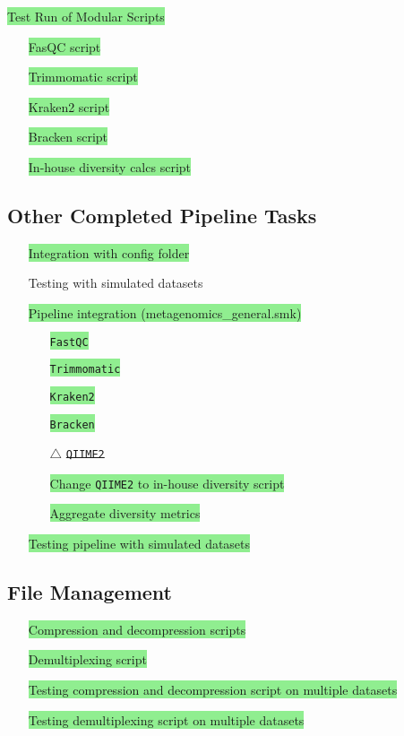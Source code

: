\documentclass[11pt]{report}
\newcommand{\done}{\checkmark}
\newcommand{\issue}{$\triangle$}
\newcommand{\highlightessential}[1]{\colorbox{lightgreen}{#1}}
\newcommand{\highlightoptional}[1]{\colorbox{lightorange}{#1}}
\newcommand{\deprecated}[1]{\sout{#1}}
\begin{document}
\begin{multicols}{2}
\highlightessential{Test Run of Modular Scripts}
\begin{itemize}
	\item [\done] \highlightessential{FasQC script}
	\item [\done] \highlightessential{Trimmomatic script}
	\item [\done] \highlightessential{Kraken2 script}
	\item [\done] \highlightessential{Bracken script}
	\item [\done] \highlightessential{In-house diversity calcs script}
\end{itemize}

\subsection*{Other Completed Pipeline Tasks}
\begin{itemize}
	\item [\done] \highlightessential{Integration with config folder}
	\item [\done] \highlightoptional{Testing with simulated datasets}
	\item [\done] \highlightessential{Pipeline integration (metagenomics\_general.smk)}
	\begin{itemize}
		\item [\done] \highlightessential{\texttt{FastQC}}
		\item [\done] \highlightessential{\texttt{Trimmomatic}}
		\item [\done] \highlightessential{\texttt{Kraken2}}
		\item [\done] \highlightessential{\texttt{Bracken}}
		\item [\issue] \deprecated{\texttt{QIIME2}}
		\item [\done] \highlightessential{Change \texttt{QIIME2} to in-house diversity script}
		\item [\done] \highlightessential{Aggregate diversity metrics}
	\end{itemize}
	\item [\done] \highlightessential{Testing pipeline with simulated datasets}
\end{itemize}

\subsection*{File Management}
\begin{itemize}
	\item [\done] \highlightessential{Compression and decompression scripts}
	\item [\done] \highlightessential{Demultiplexing script}
	\item [\done] \highlightessential{Testing compression and decompression script on multiple datasets}
	\item [\done] \highlightessential{Testing demultiplexing script on multiple datasets}
\end{itemize}


\end{multicols}
\end{document}
